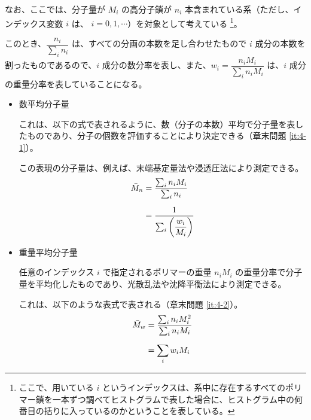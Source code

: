 \documentclass[a4paper,11pt]{ltjsarticle}
\begin{document}
なお、ここでは、分子量が $M_i$ の高分子鎖が $n_i$ 本含まれている系（ただし、インデックス変数 $i$ は、 $i=0,1,\cdots$）を対象として考えている
\footnote
{
ここで、用いている $i$ というインデックスは、系中に存在するすべてのポリマー鎖を一本ずつ調べてヒストグラムで表した場合に、ヒストグラム中の何番目の括りに入っているのかということを表している。
}。


このとき、$\dfrac{n_i}{\sum_i n_i}$ は、すべての分画の本数を足し合わせたもので $i$ 成分の本数を割ったものであるので、$i$ 成分の数分率を表し、また、$w_i=\dfrac{n_i M_i}{\sum_i n_i M_i}$ は、$i$ 成分の重量分率を表していることになる。

\begin{itemize}
\item
数平均分子量

これは、以下の式で表されるように、数（分子の本数）平均で分子量を表したものであり、分子の個数を評価することにより決定できる（章末問題 \ref{it:4-1}）。

この表現の分子量は、例えば、末端基定量法や浸透圧法により測定できる。
\begin{align}
{\bar M}_n 
	&= \dfrac{\sum_i n_i M_i}{\sum_i n_i} \notag \\[6pt]
	&= \dfrac{1}{\sum_i \left(\dfrac{w_i}{M_i} \right)}
\label{eq:Mn}
\end{align}

\item
重量平均分子量

任意のインデックス $i$ で指定されるポリマーの重量 $n_i M_i$ の重量分率で分子量を平均化したものであり、光散乱法や沈降平衡法により測定できる。

これは、以下のような表式で表される（章末問題 \ref{it:4-2}）。
\begin{align}
{\bar M}_w 
	&= \dfrac{\sum_i n_i M_i^2}{\sum_i n_i M_i}\notag \\[6pt]
	&= \displaystyle \sum_i w_i M_i
\label{eq:Mw}
\end{align}

\end{itemize}
\end{document}
